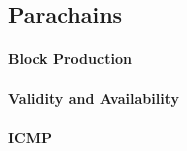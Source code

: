 \subsection{Parachains}
 \paragraph{Block Production}

 \paragraph{Validity and Availability}

 \paragraph{ICMP}
